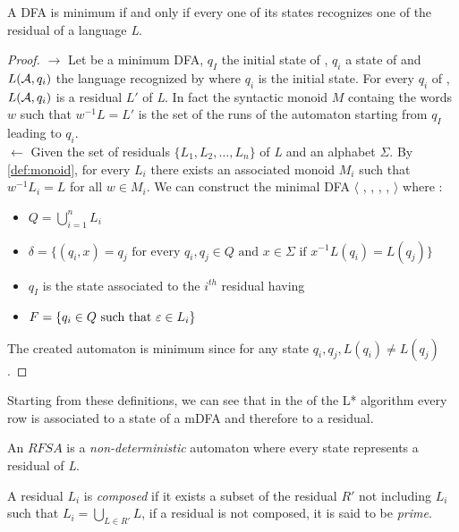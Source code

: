 \begin{theorem}
  A DFA is minimum if and only if every one of its states recognizes one of the residual of a language \textit{L}.
\end{theorem}

\begin{proof}
  $\rightarrow$ Let \automaton{} be a minimum DFA, $q_I$ the initial state of \automaton{}, $q_i$ a state of \automaton{} and $L(\mathcal{A}{}, q_i)$ the language recognized by \automaton{} where $q_i$ is the initial state. For every $q_i$ of \automaton{}, $L(\mathcal{A}{}, q_i)$ is a residual $L'$ of \textit{L}. In fact the syntactic monoid $M$ containg the words $w$ such that $w^{-1}L = L'$ is the set of the runs of the automaton starting from $q_I$ leading to $q_i$. \\
  $\leftarrow$ Given the set of residuals $\{L_1, L_2, \dots, L_n\}$ of \textit{L} and an alphabet $\Sigma$. By \cref{def:monoid}, for every $L_i$ there exists an associated monoid $M_i$ such that $w^{-1}L_i = L$ for all $w \in M_i$. We can construct the minimal DFA $\langle$ \alphabet{}, \states{}, \transition{}, \qzero{}, \qend{} $\rangle$ where :
  \begin{itemize}
    \item $Q = \bigcup_{i=1}^{n}L_i$
    \item $\delta = \{(q_i, x) = q_j \text{ for every } q_i, q_j \in Q \text{ and } x \in \Sigma \text{ if } x^{-1}L(q_i) = L(q_j)\}$
    \item $q_I$ is the state associated to the $i^{th}$ residual having
    \item $F = \{q_i \in Q \text{ such that } \varepsilon \in L_i\}$
  \end{itemize}
  The created automaton is minimum since for any state $q_i, q_j, L(q_i) \neq L(q_j)$.
\end{proof}

Starting from these definitions, we can see that in the \OT of the L* algorithm every row is associated to a state of a mDFA and therefore to a residual.

\begin{definition}
  An $RFSA$ is a \textit{non-deterministic} automaton where every state represents a residual of \textit{L}.
\end{definition}

\begin{definition}
  A residual $L_i$ is \textit{composed} if it exists a subset of the residual $R'$ not including $L_i$ such that $L_i = \bigcup_{L \in R'}L$, if a residual is not composed, it is said to be \textit{prime}.
\end{definition}

